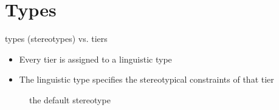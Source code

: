 \documentclass{beamer}
\begin{document}
     \section{Types}
    \begin{frame}{types (stereotypes) vs. tiers}
    \begin{itemize}
      \item Every tier is assigned to a linguistic type
      \item The linguistic type specifies the stereotypical constraints of that tier
    \end{itemize}
    \pause
      \begin{figure}[h!]
      \begin{center}
      \caption{the default stereotype}
         \setlength\fboxsep{0pt}
         \setlength\fboxrule{0pt}
      \end{center}
      \end{figure}
    \end{frame}
    
\end{document}
